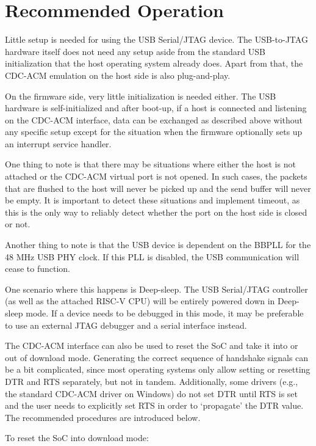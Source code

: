 \documentclass[main\_\_EN.tex]{subfiles}
\begin{document}
\section{Recommended Operation}
\label{sec:usbserialjtag-recommended-operation}

Little setup is needed for using the USB Serial/JTAG device. The USB-to-JTAG hardware itself does not need any setup aside from the standard USB initialization that the host operating system already does. Apart from that, the CDC-ACM emulation on the host side is also plug-and-play.

On the firmware side, very little initialization is needed either. The USB hardware is self-initialized and after boot-up, if a host is connected and listening on the CDC-ACM interface, data can be exchanged as described above without any specific setup except for the situation when the firmware optionally sets up an interrupt service handler.

One thing to note is that there may be situations where either the host is not attached or the CDC-ACM virtual port is not opened. In such cases, the packets that are flushed to the host will never be picked up and the send buffer will never be empty. It is important to detect these situations and implement timeout, as this is the only way to reliably detect whether the port on the host side is closed or not.

Another thing to note is that the USB device is dependent on the BBPLL for the 48 MHz USB PHY clock. If this PLL is disabled, the USB communication will cease to function.

One scenario where this happens is Deep-sleep. The USB Serial/JTAG controller (as well as the attached RISC-V CPU) will be entirely powered down in Deep-sleep mode. If a device needs to be debugged in this mode, it may be preferable to use an external JTAG debugger and a serial interface instead.

The CDC-ACM interface can also be used to reset the SoC and take it into or out of download mode. Generating the correct sequence of handshake signals can be a bit complicated, since most operating systems only allow setting or resetting DTR and RTS separately, but not in tandem. Additionally, some drivers (e.g., the standard CDC-ACM driver on Windows) do not set DTR until RTS is set and the user needs to explicitly set RTS in order to `propagate' the DTR value. The recommended procedures are introduced below.

To reset the SoC into download mode:
\end{document}
